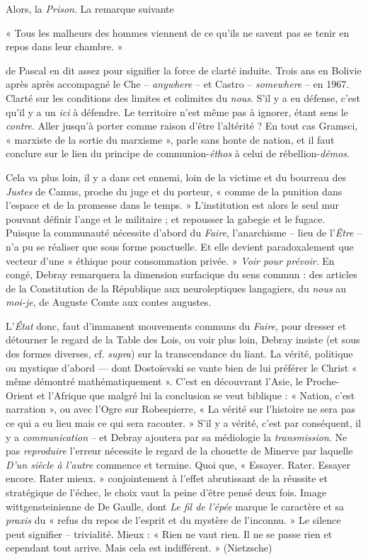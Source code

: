 \documentclass[11pt]{amsart}
\begin{document}
Alors, la \textsl{Prison}. La remarque suivante \begin{center}« Tous les malheurs des hommes viennent de ce qu'ils ne savent pas se tenir en repos dans leur chambre. »\end{center} de Pascal en dit assez pour signifier la force de clarté induite. Trois ans en Bolivie après après accompagné le Che – \textit{anywhere} – et Castro – \textit{somewhere} – en 1967. Clarté sur les conditions des limites et colimites du \textit{nous}. S'il y a eu défense, c'est qu'il y a un \textit{ici} à défendre. Le territoire n'est même pas à ignorer, étant sens le \textit{contre}. Aller jusqu'à porter comme raison d'être l'altérité ? En tout cas Gramsci, « marxiste de la sortie du marxisme »,  parle sans honte de nation, et il faut conclure sur le lien du principe de communion-\textit{éthos} à celui de rébellion-\textit{démos}.

Cela va plus loin, il y a dans cet ennemi, loin de la victime et du bourreau des \textsl{Justes} de Camus, proche du juge et du porteur, « comme de la punition dans l'espace et de la promesse dans le temps. » L'institution est alors le seul mur pouvant définir l'ange et le militaire ; et repousser la gabegie et le fugace. Puisque la communauté nécessite d'abord du \textit{Faire}, l'anarchisme – lieu de l'\textit{Être} – n'a pu se réaliser que sous forme ponctuelle. Et elle devient paradoxalement que vecteur d'une « éthique pour consommation privée. » \textsl{Voir pour prévoir}. En congé, Debray remarquera la dimension surfacique du sens commun :  des articles de la Constitution de la République aux neuroleptiques langagiers, du \textit{nous} au \textit{moi-je}, de Auguste Comte aux contes augustes.

L'\textsl{\'Etat} donc, faut d'immanent mouvements communs du \textit{Faire}, pour dresser et détourner le regard de la Table des Lois, ou voir plus loin, Debray insiste (et sous des formes diverses, cf. \textit{supra}) sur la transcendance du liant. La vérité, politique ou mystique d'abord — dont Dostoïevski se vante bien de lui préférer le Christ « même démontré mathématiquement ». C'est en découvrant l'Asie, le Proche-Orient et l'Afrique que malgré lui la conclusion se veut biblique : « Nation, c'est narration », ou avec l'Ogre sur Robespierre, « La vérité sur l'histoire ne sera pas ce qui a eu lieu mais ce qui sera raconter. » S'il y a vérité, c'est par conséquent, il y a \textit{communication} – et Debray ajoutera par sa médiologie la \textit{transmission}. Ne pas \textit{reproduire} l'erreur nécessite le regard de la chouette de Minerve par laquelle \textsl{D'un siècle à l'autre} commence et termine. Quoi que, « Essayer. Rater. Essayer encore. Rater mieux. » conjointement à l'effet abrutissant de la réussite et stratégique de l'échec, le choix vaut la peine d'être pensé deux fois. Image wittgensteinienne de De Gaulle, dont \textsl{Le fil de l'épée} marque le caractère et sa \textit{praxis} du « refus du repos de l'esprit et du mystère de l'inconnu. » Le silence peut signifier – trivialité. Mieux : « Rien ne vaut rien. Il ne se passe rien et cependant tout arrive. Mais cela est indifférent. » (Nietzsche)
\end{document}
